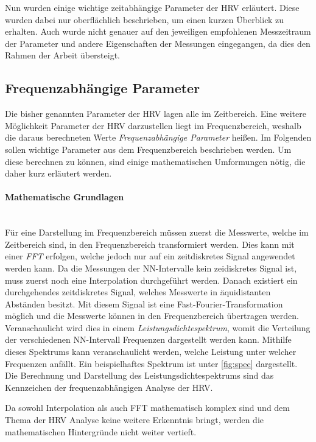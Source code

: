 Nun wurden einige wichtige zeitabhängige Parameter der \acs{HRV} erläutert. Diese wurden dabei nur oberflächlich beschrieben, um einen kurzen Überblick zu erhalten. Auch wurde nicht genauer auf den jeweiligen empfohlenen Messzeitraum der Parameter und andere Eigenschaften der Messungen eingegangen, da dies den Rahmen der Arbeit übersteigt. 
 
\subsection{Frequenzabhängige Parameter}	

Die bisher genannten Parameter der \acs{HRV} lagen alle im Zeitbereich. Eine weitere Möglichkeit Parameter der \acs{HRV} darzustellen liegt im Frequenzbereich, weshalb die daraus berechneten Werte \textit{Frequenzabhängige Parameter} heißen. Im Folgenden sollen wichtige Parameter aus dem Frequenzbereich beschrieben werden. Um diese berechnen zu können, sind einige mathematischen Umformungen nötig, die daher kurz erläutert werden.\\

\paragraph{Mathematische Grundlagen}\mbox{} \\
Für eine Darstellung im Frequenzbereich müssen zuerst die Messwerte, welche im Zeitbereich sind, in den Frequenzbereich transformiert werden. Dies kann mit einer \textit{\ac{FFT}} erfolgen, welche jedoch nur auf ein zeitdiskretes Signal angewendet werden kann. Da die Messungen der NN-Intervalle kein zeidiskretes Signal ist, muss zuerst noch eine Interpolation durchgeführt werden. Danach existiert ein durchgehendes zeitdiskretes Signal, welches Messwerte in äquidistanten Abständen besitzt. Mit diesem Signal ist eine Fast-Fourier-Transformation möglich und die Messwerte können in den Frequenzbereich übertragen werden. Veranschaulicht wird dies in einem \textit{Leistungsdichtespektrum}, womit die Verteilung der verschiedenen NN-Intervall Frequenzen dargestellt werden kann. Mithilfe dieses Spektrums kann veranschaulicht werden, welche Leistung unter welcher Frequenzen anfällt. Ein beispielhaftes Spektrum ist unter \ref{fig:spec} dargestellt. Die Berechnung und Darstellung des Leistungsdichtespektrums sind das Kennzeichen der frequenzabhängigen Analyse der \acs{HRV}.\cite{freque}

Da sowohl Interpolation als auch \acs{FFT} mathematisch komplex sind und dem Thema der \acs{HRV} Analyse keine weitere Erkenntnis bringt, werden die mathematischen Hintergründe nicht weiter vertieft.

